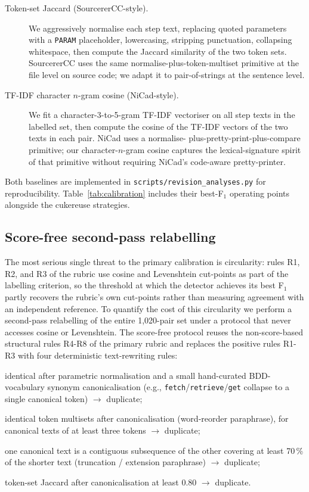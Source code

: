 \documentclass[11pt,a4paper]{article}
\begin{document}
\begin{description}
\item[Token-set Jaccard (SourcererCC-style).] We aggressively normalise
each step text, replacing quoted parameters with a \texttt{PARAM}
placeholder, lowercasing, stripping punctuation, collapsing
whitespace, then compute the Jaccard similarity of the two token
sets. SourcererCC \citep{sajnani2016sourcerercc} uses the same
normalise-plus-token-multiset primitive at the file level on source
code; we adapt it to pair-of-strings at the sentence level.
\item[TF-IDF character $n$-gram cosine (NiCad-style).] We fit a
character-3-to-5-gram TF-IDF vectoriser on all step texts in the
labelled set, then compute the cosine of the TF-IDF vectors of the
two texts in each pair. NiCad \citep{cordy2011nicad} uses a normalise-
plus-pretty-print-plus-compare primitive; our character-$n$-gram
cosine captures the lexical-signature spirit of that primitive
without requiring NiCad's code-aware pretty-printer.
\end{description}

Both baselines are implemented in \texttt{scripts/revision\_analyses.py}
for reproducibility. Table~\ref{tab:calibration} includes their
best-F$_1$ operating points alongside the cukereuse strategies.

\subsection{Score-free second-pass relabelling}
\label{sec:evaluation:score-free}

The most serious single threat to the primary calibration is
circularity: rules R1, R2, and R3 of the rubric use cosine and
Levenshtein cut-points as part of the labelling criterion, so the
threshold at which the detector achieves its best F$_1$ partly
recovers the rubric's own cut-points rather than measuring agreement
with an independent reference. To quantify the cost of this
circularity we perform a second-pass relabelling of the entire
1{,}020-pair set under a protocol that never accesses cosine or
Levenshtein. The score-free protocol reuses the non-score-based
structural rules R4-R8 of the primary rubric and replaces the
positive rules R1-R3 with four deterministic text-rewriting rules:

\begin{description}[style=nextline,leftmargin=1.5em]
\item[P1] identical after parametric normalisation and a small
hand-curated BDD-vocabulary synonym canonicalisation (e.g.,
\texttt{fetch}/\texttt{retrieve}/\texttt{get} collapse to a single
canonical token) $\to$ duplicate;
\item[P2] identical token multisets after canonicalisation (word-reorder
paraphrase), for canonical texts of at least three tokens $\to$
duplicate;
\item[P3] one canonical text is a contiguous subsequence of the
other covering at least 70\,\% of the shorter text (truncation /
extension paraphrase) $\to$ duplicate;
\item[P4] token-set Jaccard after canonicalisation at least 0.80
$\to$ duplicate.
\end{description}
\end{document}

